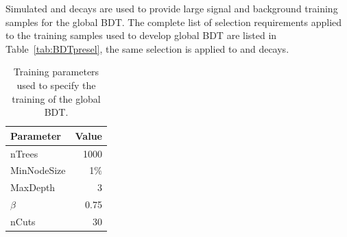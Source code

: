 Simulated \bsmumu and \bbbarmumux decays are used to provide large signal and background training samples for the global BDT. %
The complete list of selection requirements applied to the training samples used to develop global BDT are listed in Table~\ref{tab:BDTpresel}, the same selection is applied to \bsmumu and \bbbarmumux decays.  

\begin{table}[tbp]
\begin{center}
\begin{tabular}{lr}
\toprule \toprule
Parameter & Value \\ \midrule
nTrees & 1000 \\
MinNodeSize & 1$\%$ \\
MaxDepth & 3 \\
$\beta$ & 0.75 \\
nCuts & 30 \\
\bottomrule \bottomrule
\end{tabular}
\vspace{0.7cm}
\caption{Training parameters used to specify the training of the global BDT.}
\label{tab:BDTtrainingparams}
\end{center}
\vspace{-1.0cm}
\end{table}

